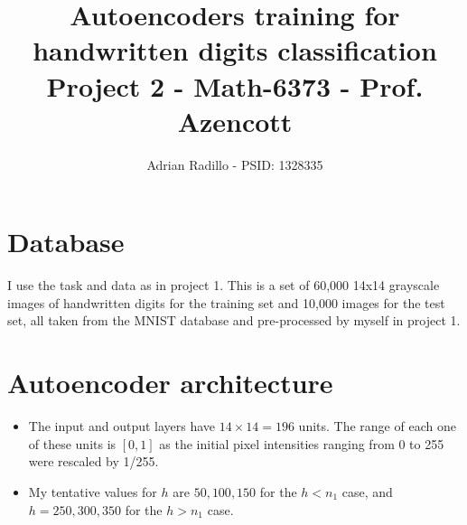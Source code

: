 \documentclass{article}
\title{Autoencoders training for handwritten digits classification \\ {\large Project 2 - Math-6373 - Prof. Azencott}}
\author{Adrian Radillo - PSID: 1328335}
\begin{document}


\maketitle
\section{Database}
I use the task and data as in project 1. This is a set of
60,000 14x14 grayscale images of handwritten digits for the training set and
10,000 images for the test set, all taken from the MNIST database and pre-processed by myself
in project 1.

\section{Autoencoder architecture}
\begin{itemize}
\item The input and output layers have $14\times14=196$ units. The range of each one of these units  
is $[0,1]$ as the initial pixel intensities ranging from 0 to 255 were rescaled by 1/255.
\item My tentative values for $h$ are $50,100,150$ for the $h<n_1$ case, and $h=250,300,350$ for the $h>n_1$ case.
\end{itemize}
\end{document}
